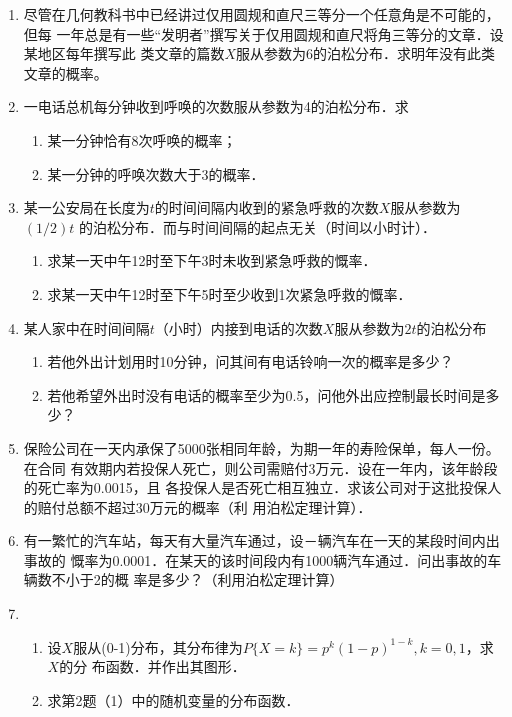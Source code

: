 \documentclass[10pt,a4paper]{article}
\begin{document}
\begin{enumerate}
    \item 尽管在几何教科书中已经讲过仅用圆规和直尺三等分一个任意角是不可能的，但每
    一年总是有一些“发明者”撰写关于仅用圆规和直尺将角三等分的文章．设某地区每年撰写此
    类文章的篇数$X$服从参数为6的泊松分布．求明年没有此类文章的概率。


    \item 一电话总机每分钟收到呼唤的次数服从参数为4的泊松分布．求
    \begin{enumerate}
        \item 某一分钟恰有8次呼唤的概率；
        \item 某一分钟的呼唤次数大于3的概率．
    \end{enumerate}


    \item 某一公安局在长度为$t$的时间间隔内收到的紧急呼救的次数$X$服从参数为$(1/2)t$
    的泊松分布．而与时间间隔的起点无关（时间以小时计）．
    \begin{enumerate}
        \item 求某一天中午12时至下午3时未收到紧急呼救的慨率．
        \item 求某一天中午12时至下午5时至少收到1次紧急呼救的慨率．
    \end{enumerate}



    \item 某人家中在时间间隔$t$（小时）内接到电话的次数$X$服从参数为$2t$的泊松分布
    \begin{enumerate}
        \item 若他外出计划用时10分钟，问其间有电话铃响一次的概率是多少？
        \item 若他希望外出时没有电话的概率至少为0.5，问他外出应控制最长时间是多少？
    \end{enumerate}



    \item 保险公司在一天内承保了5000张相同年龄，为期一年的寿险保单，每人一份。在合同
    有效期内若投保人死亡，则公司需赔付3万元．设在一年内，该年龄段的死亡率为0.0015，且
    各投保人是否死亡相互独立．求该公司对于这批投保人的赔付总额不超过30万元的概率（利
    用泊松定理计算）．

    \item 有一繁忙的汽车站，每天有大量汽车通过，设－辆汽车在一天的某段时间内出事故的
    慨率为0.0001．在某天的该时间段内有1000辆汽车通过．问出事故的车辆数不小于2的概
    率是多少？（利用泊松定理计算）


    \item \begin{enumerate}
        \item 设$X$服从(0-1)分布，其分布律为$P\{X=k\}=p^k{(1-p)}^{1-k},k=0,1$，求$X$的分
        布函数．并作出其图形．
        \item 求第2题（1）中的随机变量的分布函数．
    \end{enumerate}



\end{enumerate}
\end{document}
